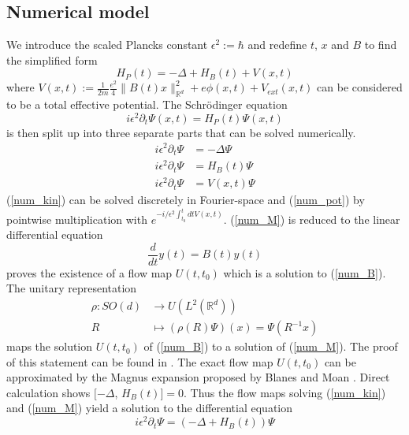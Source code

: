 \documentclass{article}
\begin{document}
\subsection{Numerical model}
We introduce the scaled Plancks constant $\epsilon ^2 := \hbar$ and redefine $t$, $x$ and $B$ to find the simplified form
\begin{equation}
  H_P(t) = -\Delta + H_B(t) + V(x,t)
\end{equation}
where $V(x,t) := \frac{1}{2m}\frac{e^{2}}{4}\|B(t) x\|_{\mathbb{R}^{d}}^{2} + e \phi(x,t) + V_{ext}(x,t)$ can be considered to be a total effective potential.
The Schr{\"o}dinger equation
\begin{equation} \label{num_main} \tag{H}
  i \epsilon ^2 \partial_t \Psi(x, t) = H_P(t)\Psi(x,t)
\end{equation}
is then split up into three separate parts that can be solved numerically.
\begin{align}
  i \epsilon^2 \partial_t \Psi &= -\Delta \Psi \label{num_kin} \tag{K}\\
  i \epsilon^2 \partial_t \Psi &= H_B(t) \Psi \label{num_M} \tag{M}\\
  i \epsilon^2 \partial_t \Psi &= V(x,t) \Psi \label{num_pot} \tag{P}
\end{align}
(\ref{num_kin}) can be solved discretely in Fourier-space and (\ref{num_pot}) by pointwise multiplication with $e^{-i/\epsilon ^2 \int_{t_0}^t dt V(x,t)}$. (\ref{num_M}) is reduced to the linear differential equation
\begin{equation} \label{num_B} \tag{B}
  \frac{d}{dt}y(t) = B(t)y(t)
\end{equation}
\cite{simon_reed} proves the existence of a flow map $U(t,t_0)$ which is a solution to (\ref{num_B}). The unitary representation
\begin{align} \label{eq_rho}
  \rho : SO(d) &\longrightarrow U(L^2(\mathbb{R}^d)) \\
  R &\longmapsto (\rho (R)\Psi)(x) = \Psi(R^{-1} x)
\end{align}
maps the solution $U(t, t_0)$ of (\ref{num_B}) to a solution of (\ref{num_M}). The proof of this statement can be found in \cite{paper_orvg}. The exact flow map $U(t, t_0)$ can be approximated by the Magnus expansion proposed by Blanes and Moan \cite{magnus_integrators}.
Direct calculation shows  $[-\Delta$, $H_B(t)] = 0$. Thus the flow maps solving (\ref{num_kin}) and (\ref{num_M}) yield a solution to the differential equation
\begin{equation} \label{num_K_M} \tag{K+M}
  i \epsilon ^2 \partial_t \Psi = (-\Delta + H_B(t))\Psi
\end{equation}
\end{document}
